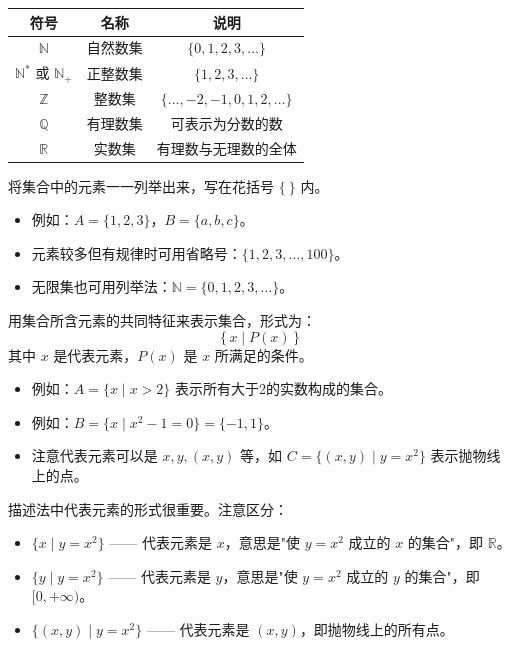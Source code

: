 \documentclass[12pt, a4paper]{ctexart}
\begin{document}
\begin{knowledgebox}[常用数集]
\begin{center}
\renewcommand{\arraystretch}{1.3}
\begin{tabular}{c|c|c}
\toprule
\textbf{符号} & \textbf{名称} & \textbf{说明} \\
\midrule
$\mathbb{N}$ & 自然数集 & $\{0, 1, 2, 3, \ldots\}$ \\
$\mathbb{N}^*$ 或 $\mathbb{N}_+$ & 正整数集 & $\{1, 2, 3, \ldots\}$ \\
$\mathbb{Z}$ & 整数集 & $\{\ldots, -2, -1, 0, 1, 2, \ldots\}$ \\
$\mathbb{Q}$ & 有理数集 & 可表示为分数的数 \\
$\mathbb{R}$ & 实数集 & 有理数与无理数的全体 \\
\bottomrule
\end{tabular}
\end{center}
\end{knowledgebox}

\begin{knowledgebox}[列举法]
将集合中的元素一一列举出来，写在花括号 $\{\ \}$ 内。
\begin{itemize}[leftmargin=2em]
  \item 例如：$A = \{1, 2, 3\}$，$B = \{a, b, c\}$。
  \item 元素较多但有规律时可用省略号：$\{1, 2, 3, \ldots, 100\}$。
  \item 无限集也可用列举法：$\mathbb{N} = \{0, 1, 2, 3, \ldots\}$。
\end{itemize}
\end{knowledgebox}

\begin{knowledgebox}[描述法]
用集合所含元素的共同特征来表示集合，形式为：
\[
  \{\, x \mid P(x) \,\}
\]
其中 $x$ 是代表元素，$P(x)$ 是 $x$ 所满足的条件。
\begin{itemize}[leftmargin=2em]
  \item 例如：$A = \{x \mid x > 2\}$ 表示所有大于2的实数构成的集合。
  \item 例如：$B = \{x \mid x^2 - 1 = 0\} = \{-1, 1\}$。
  \item 注意代表元素可以是 $x, y, (x,y)$ 等，如 $C = \{(x,y) \mid y = x^2\}$ 表示抛物线上的点。
\end{itemize}
\end{knowledgebox}

\begin{warnbox}
描述法中代表元素的形式很重要。注意区分：
\begin{itemize}[leftmargin=2em]
  \item $\{x \mid y = x^2\}$ —— 代表元素是 $x$，意思是"使 $y = x^2$ 成立的 $x$ 的集合"，即 $\mathbb{R}$。
  \item $\{y \mid y = x^2\}$ —— 代表元素是 $y$，意思是"使 $y = x^2$ 成立的 $y$ 的集合"，即 $[0, +\infty)$。
  \item $\{(x,y) \mid y = x^2\}$ —— 代表元素是 $(x,y)$，即抛物线上的所有点。
\end{itemize}
\end{warnbox}
\end{document}
